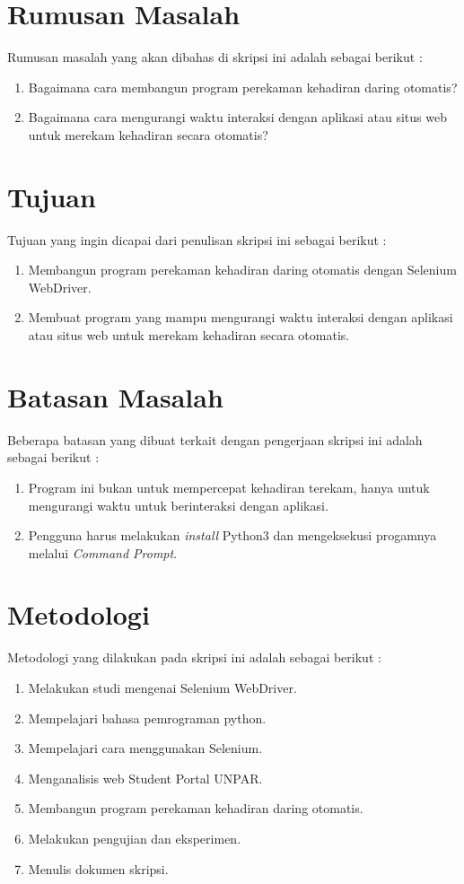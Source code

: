 \section{Rumusan Masalah}
\label{sec:rumusan}
Rumusan masalah yang akan dibahas di skripsi ini adalah sebagai berikut :
\begin{enumerate}
	\item Bagaimana cara membangun program perekaman kehadiran daring otomatis?
	\item Bagaimana cara mengurangi waktu interaksi dengan aplikasi atau situs web untuk merekam kehadiran secara otomatis?
\end{enumerate}

\section{Tujuan}
\label{sec:tujuan}
Tujuan yang ingin dicapai dari penulisan skripsi ini sebagai berikut :
\begin{enumerate}
	\item Membangun program perekaman kehadiran daring otomatis dengan Selenium WebDriver.
	\item Membuat program yang mampu mengurangi waktu interaksi dengan aplikasi atau situs web untuk merekam kehadiran secara otomatis.
\end{enumerate}

\section{Batasan Masalah}
\label{sec:batasan}
Beberapa batasan yang dibuat terkait dengan pengerjaan skripsi ini adalah sebagai berikut :
\begin{enumerate}
	\item Program ini bukan untuk mempercepat kehadiran terekam, hanya untuk mengurangi waktu untuk berinteraksi dengan aplikasi.
	\item Pengguna harus melakukan \textit{install} Python3 dan mengeksekusi progamnya melalui \textit{Command Prompt}.
\end{enumerate}


\section{Metodologi}
\label{sec:metlit}
Metodologi yang dilakukan pada skripsi ini adalah sebagai berikut :
\begin{enumerate}
	\item Melakukan studi mengenai Selenium WebDriver.
	\item Mempelajari bahasa pemrograman python.
	\item Mempelajari cara menggunakan Selenium.
	\item Menganalisis web Student Portal UNPAR.
	\item Membangun program perekaman kehadiran daring otomatis.
	\item Melakukan pengujian dan eksperimen.
	\item Menulis dokumen skripsi.		
\end{enumerate}


